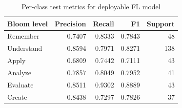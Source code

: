 \begin{table}[t]
\centering
\caption{Per-class test metrics for deployable FL model}
\begin{tabular}{lrrrr}
\toprule
Bloom level & Precision & Recall & F1 & Support \\
\midrule
Remember & 0.7407 & 0.8333 & 0.7843 & 48 \\
Understand & 0.8594 & 0.7971 & 0.8271 & 138 \\
Apply & 0.6809 & 0.7442 & 0.7111 & 43 \\
Analyze & 0.7857 & 0.8049 & 0.7952 & 41 \\
Evaluate & 0.8511 & 0.9302 & 0.8889 & 43 \\
Create & 0.8438 & 0.7297 & 0.7826 & 37 \\
\bottomrule
\end{tabular}
\end{table}
